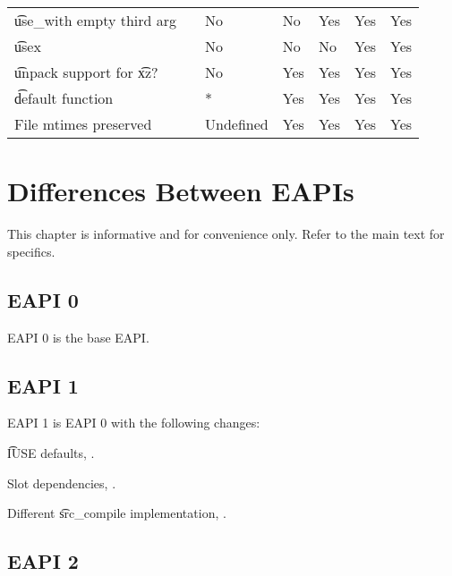 \begin{landscape}
\begin{longtable}{llP{7.5em}P{7.5em}P{7.5em}P{7.5em}P{7.5em}}
\t{use\_with} empty third arg &  &
    No & No & Yes & Yes & Yes \\

\t{usex} &  &
    No & No & No & Yes & Yes \\

\t{unpack} support for \t{xz}? &  &
    No & Yes & Yes & Yes & Yes \\

\t{default} function &  &
    * & Yes & Yes & Yes & Yes \\

File mtimes preserved &  &
    Undefined & Yes & Yes & Yes & Yes \\

\end{longtable}
\end{landscape}

\chapter{Differences Between EAPIs}

\note This chapter is informative and for convenience only. Refer to the main text for specifics.

\section*{EAPI 0}

EAPI 0 is the base EAPI.

\section*{EAPI 1}

EAPI 1 is EAPI 0 with the following changes:

\begin{compactitem}
\item \t{IUSE} defaults, .
\item Slot dependencies, .
\item Different \t{src\_compile} implementation, .
\end{compactitem}

\section*{EAPI 2}

